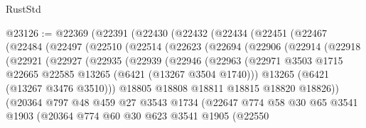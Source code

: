 \begin{lexlean}{RustStd}
\begin{coremodule}
@23126 := @22369
    (@22391
      (@22430
        (@22432
          (@22434
            (@22451
              (@22467
                (@22484
                  (@22497
                    (@22510
                      (@22514
                        (@22623
                          (@22694
                            (@22906
                              (@22914
                                (@22918
                                  (@22921
                                    (@22927
                                      (@22935
                                        (@22939
                                          (@22946
                                            (@22963
                                              (@22971
                                                @3503
                                                @1715
                                                @22665
                                                @22585
                                                @13265
                                                (@6421 (@13267 @3504 @1740)))
                                              @13265
                                              (@6421 (@13267 @3476 @3510)))
                                            @18805
                                            @18808
                                            @18811
                                            @18815
                                            @18820
                                            @18826))
                                        (@20364
                                          @797
                                          @48
                                          @459
                                          @27
                                          @3543
                                          @1734
                                          (@22647
                                            @774
                                            @58
                                            @30
                                            @65
                                            @3541
                                            @1903
                                            (@20364
                                              @774
                                              @60
                                              @30
                                              @623
                                              @3541
                                              @1905
                                              (@22550

\end{coremodule}
\end{lexlean}
